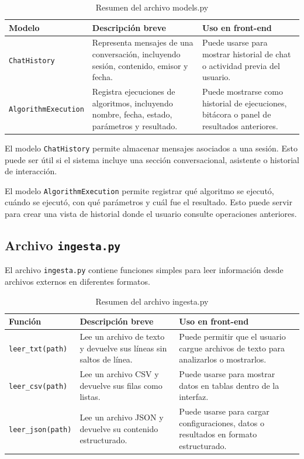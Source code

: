 \documentclass[12pt]{article}
\begin{document}
	\begin{table}[H]
		\centering
		\begin{tabular}{|p{4cm}|p{5cm}|p{5cm}|}
			\hline
			\textbf{Modelo} & \textbf{Descripción breve} & \textbf{Uso en front-end} \\
			\hline
			\texttt{ChatHistory} & Representa mensajes de una conversación, incluyendo sesión, contenido, emisor y fecha. & Puede usarse para mostrar historial de chat o actividad previa del usuario. \\
			\hline
			\texttt{AlgorithmExecution} & Registra ejecuciones de algoritmos, incluyendo nombre, fecha, estado, parámetros y resultado. & Puede mostrarse como historial de ejecuciones, bitácora o panel de resultados anteriores. \\
			\hline
		\end{tabular}
		\caption{Resumen del archivo models.py}
	\end{table}
	
	El modelo \texttt{ChatHistory} permite almacenar mensajes asociados a una sesión. Esto puede ser útil si el sistema incluye una sección conversacional, asistente o historial de interacción.
	
	El modelo \texttt{AlgorithmExecution} permite registrar qué algoritmo se ejecutó, cuándo se ejecutó, con qué parámetros y cuál fue el resultado. Esto puede servir para crear una vista de historial donde el usuario consulte operaciones anteriores.
	
	\subsection{Archivo \texttt{ingesta.py}}
	
	El archivo \texttt{ingesta.py} contiene funciones simples para leer información desde archivos externos en diferentes formatos.
	
	\begin{table}[H]
		\centering
		\begin{tabular}{|p{4cm}|p{5cm}|p{5cm}|}
			\hline
			\textbf{Función} & \textbf{Descripción breve} & \textbf{Uso en front-end} \\
			\hline
			\texttt{leer\_txt(path)} & Lee un archivo de texto y devuelve sus líneas sin saltos de línea. & Puede permitir que el usuario cargue archivos de texto para analizarlos o mostrarlos. \\
			\hline
			\texttt{leer\_csv(path)} & Lee un archivo CSV y devuelve sus filas como listas. & Puede usarse para mostrar datos en tablas dentro de la interfaz. \\
			\hline
			\texttt{leer\_json(path)} & Lee un archivo JSON y devuelve su contenido estructurado. & Puede usarse para cargar configuraciones, datos o resultados en formato estructurado. \\
			\hline
		\end{tabular}
		\caption{Resumen del archivo ingesta.py}
	\end{table}
	
\end{document}
